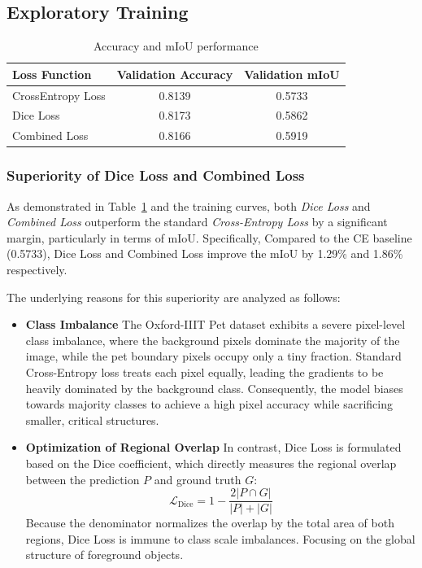 \subsection{Exploratory Training}
\begin{table}[H]
\centering
\caption{Accuracy and mIoU performance}
\label{tab:loss_ablation}
\begin{tabular}{l c c} %
\toprule
Loss Function & Validation Accuracy & Validation mIoU \\
\midrule
CrossEntropy Loss & 0.8139 & 0.5733 \\ %
Dice Loss & 0.8173 & 0.5862 \\
Combined Loss & 0.8166 & 0.5919 \\ %
\bottomrule
\end{tabular}
\end{table}

\subsubsection{Superiority of Dice Loss and Combined Loss}
As demonstrated in Table~\ref{tab:loss_ablation} and the training curves, both \textit{Dice Loss} and \textit{Combined Loss} outperform the standard \textit{Cross-Entropy Loss} by a significant margin, particularly in terms of mIoU. Specifically, Compared to the CE baseline (0.5733), Dice Loss and Combined Loss improve the mIoU by 1.29\% and 1.86\% respectively. 

The underlying reasons for this superiority are analyzed as follows:
\begin{itemize}
    \item \textbf{Class Imbalance} The Oxford-IIIT Pet dataset exhibits a severe pixel-level class imbalance, where the background pixels dominate the majority of the image, while the pet boundary pixels occupy only a tiny fraction. Standard Cross-Entropy loss treats each pixel equally, leading the gradients to be heavily dominated by the background class. Consequently, the model biases towards majority classes to achieve a high pixel accuracy while sacrificing smaller, critical structures.
    \item \textbf{Optimization of Regional Overlap} In contrast, Dice Loss is formulated based on the Dice coefficient, which directly measures the regional overlap between the prediction $P$ and ground truth $G$:
    \[
        \mathcal{L}_{\text{Dice}} = 1 - \frac{2 |P \cap G|}{|P| + |G|}
    \]
    Because the denominator normalizes the overlap by the total area of both regions, Dice Loss is immune to class scale imbalances. Focusing on the global structure of foreground objects.
\end{itemize}


